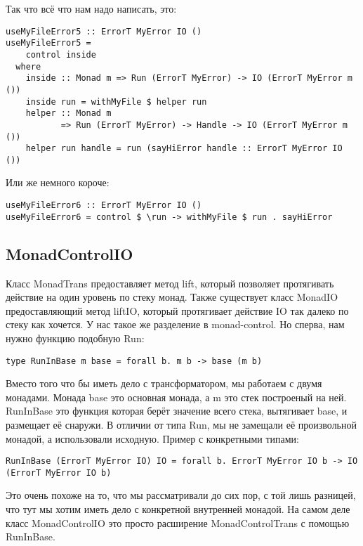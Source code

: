 Так что всё что нам надо написать, это:

\begin{lstlisting}
useMyFileError5 :: ErrorT MyError IO ()
useMyFileError5 =
    control inside
  where
    inside :: Monad m => Run (ErrorT MyError) -> IO (ErrorT MyError m ())
    inside run = withMyFile $ helper run
    helper :: Monad m
           => Run (ErrorT MyError) -> Handle -> IO (ErrorT MyError m ())
    helper run handle = run (sayHiError handle :: ErrorT MyError IO ())
\end{lstlisting}

Или же немного короче:

\begin{lstlisting}
useMyFileError6 :: ErrorT MyError IO ()
useMyFileError6 = control $ \run -> withMyFile $ run . sayHiError
\end{lstlisting}

\subsection{MonadControlIO}
Класс MonadTrans предоставляет метод lift, который позволяет протягивать
действие на один уровень по стеку монад. Также существует класс MonadIO
предоставляющий метод liftIO, который протягивает действие IO так далеко по
стеку как хочется. У нас такое же разделение в monad-control. Но сперва, нам
нужно функцию подобную Run:

\begin{lstlisting}
type RunInBase m base = forall b. m b -> base (m b)
\end{lstlisting}

Вместо того что бы иметь дело с трансформатором, мы работаем с двумя монадами.
Монада base это основная монада, а m это стек построеный на ней. RunInBase это
функция которая берёт значение всего стека, вытягивает base, и размещает её
снаружи. В отличии от типа Run, мы не замещали её произвольной монадой, а
использовали исходную. Пример с конкретными типами:

\begin{lstlisting}
RunInBase (ErrorT MyError IO) IO = forall b. ErrorT MyError IO b -> IO (ErrorT MyError IO b)
\end{lstlisting}

Это очень похоже на то, что мы рассматривали до сих пор, с той лишь разницей,
что тут мы хотим иметь дело с конкретной внутренней монадой. На самом деле
класс MonadControlIO это просто расширение MonadControlTrans с помощью
RunInBase.

